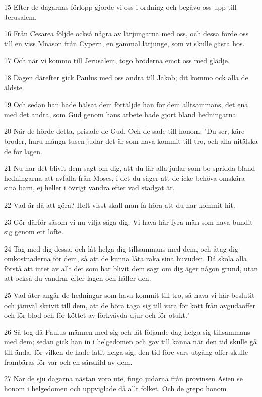 \par 15 Efter de dagarnas förlopp gjorde vi oss i ordning och begåvo oss upp till Jerusalem.
\par 16 Från Cesarea följde också några av lärjungarna med oss, och dessa förde oss till en viss Mnason från Cypern, en gammal lärjunge, som vi skulle gästa hos.
\par 17 Och när vi kommo till Jerusalem, togo bröderna emot oss med glädje.
\par 18 Dagen därefter gick Paulus med oss andra till Jakob; dit kommo ock alla de äldste.
\par 19 Och sedan han hade hälsat dem förtäljde han för dem alltsammans, det ena med det andra, som Gud genom hans arbete hade gjort bland hedningarna.
\par 20 När de hörde detta, prisade de Gud. Och de sade till honom: "Du ser, käre broder, huru många tusen judar det är som hava kommit till tro, och alla nitälska de för lagen.
\par 21 Nu har det blivit dem sagt om dig, att du lär alla judar som bo spridda bland hedningarna att avfalla från Moses, i det du säger att de icke behöva omskära sina barn, ej heller i övrigt vandra efter vad stadgat är.
\par 22 Vad är då att göra? Helt visst skall man få höra att du har kommit hit.
\par 23 Gör därför såsom vi nu vilja säga dig. Vi hava här fyra män som hava bundit sig genom ett löfte.
\par 24 Tag med dig dessa, och låt helga dig tillsammans med dem, och åtag dig omkostnaderna för dem, så att de kunna låta raka sina huvuden. Då skola alla förstå att intet av allt det som har blivit dem sagt om dig äger någon grund, utan att också du vandrar efter lagen och håller den.
\par 25 Vad åter angår de hedningar som hava kommit till tro, så hava vi här beslutit och jämväl skrivit till dem, att de böra taga sig till vara för kött från avgudaoffer och för blod och för köttet av förkvävda djur och för otukt."
\par 26 Så tog då Paulus männen med sig och lät följande dag helga sig tillsammans med dem; sedan gick han in i helgedomen och gav till känna när den tid skulle gå till ända, för vilken de hade låtit helga sig, den tid före vars utgång offer skulle frambäras för var och en särskild av dem.
\par 27 När de sju dagarna nästan voro ute, fingo judarna från provinsen Asien se honom i helgedomen och uppviglade då allt folket. Och de grepo honom
